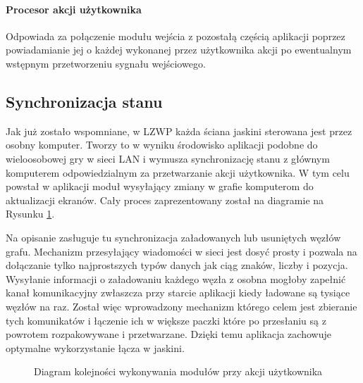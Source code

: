 \paragraph{Procesor akcji użytkownika}
Odpowiada za połączenie modułu wejścia z pozostałą częścią aplikacji poprzez powiadamianie jej o każdej wykonanej przez użytkownika akcji po ewentualnym wstępnym przetworzeniu sygnału wejściowego.



\subsection{Synchronizacja stanu}
Jak już zostało wspomniane, w LZWP każda ściana jaskini sterowana jest przez osobny komputer. Tworzy to w wyniku środowisko aplikacji podobne do wieloosobowej gry w sieci LAN i wymusza synchronizację stanu z głównym komputerem odpowiedzialnym za przetwarzanie akcji użytkownika. W tym celu powstał w aplikacji moduł wysyłający zmiany w grafie komputerom do aktualizacji ekranów. Cały proces zaprezentowany został na diagramie na Rysunku \ref{fig:diagram-modolow}.

Na opisanie zasługuje tu synchronizacja załadowanych lub usuniętych węzłów grafu. Mechanizm przesyłający wiadomości w sieci jest dosyć prosty i pozwala na dołączanie tylko najprostszych typów danych jak ciąg znaków, liczby i pozycja. Wysyłanie informacji o załadowaniu każdego węzła z osobna mogłoby zapełnić kanał komunikacyjny zwłaszcza przy starcie aplikacji kiedy ładowane są tysiące węzłów na raz. Został więc wprowadzony mechanizm którego celem jest zbieranie tych komunikatów i łączenie ich w większe paczki które po przesłaniu są z powrotem rozpakowywane i przetwarzane. Dzięki temu aplikacja zachowuje optymalne wykorzystanie łącza w jaskini.

\begin{figure}[H]
\begin{center}
\end{center}
\caption{Diagram kolejności wykonywania modułów przy akcji użytkownika}
\label{fig:diagram-modolow}
\end{figure}


